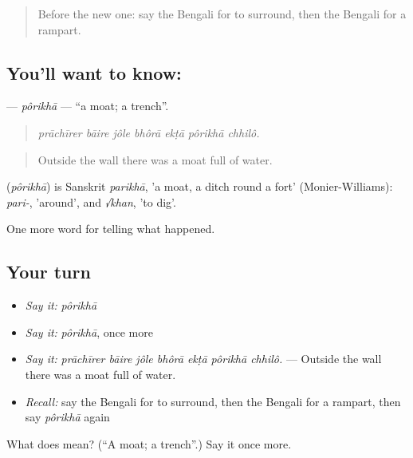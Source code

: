 \begin{quote}
Before the new one: say the Bengali for to surround, then the Bengali for a rampart.
\end{quote}

\subsection*{You'll want to know: }
\textbf{} — \emph{pôrikhā} — \textquotedblleft{}a moat; a trench\textquotedblright{}.

\begin{quote}
      
\end{quote}

\begin{quote}
\emph{prāchīrer bāire jôle bhôrā ekṭā pôrikhā chhilô.}
\end{quote}

\begin{quote}
Outside the wall there was a moat full of water.
\end{quote}

\begin{cousinweb}
\textbf{} (\emph{pôrikhā}) is Sanskrit \emph{parikhā}, 'a moat, a ditch round a fort' (Monier-Williams): \emph{pari-}, 'around', and \emph{√khan}, 'to dig'.
\end{cousinweb}

\begin{grammarlens}[title={What you've built}]
One more word for telling what happened.
\end{grammarlens}

\subsection*{Your turn}
\begin{itemize}
\raggedright
  \item \emph{Say it:} \emph{pôrikhā}
  \item \emph{Say it:} \emph{pôrikhā}, once more
  \item \emph{Say it:} \emph{prāchīrer bāire jôle bhôrā ekṭā pôrikhā chhilô.} — Outside the wall there was a moat full of water.
  \item \emph{Recall:} say the Bengali for to surround, then the Bengali for a rampart, then say \emph{pôrikhā} again
\end{itemize}

\begin{tcolorbox}[breakable,colback=teal!4,colframe=teal!35!black,title={Before you move on}]
What does  mean? (\textquotedblleft{}A moat; a trench\textquotedblright{}.) Say it once more.
\end{tcolorbox}
